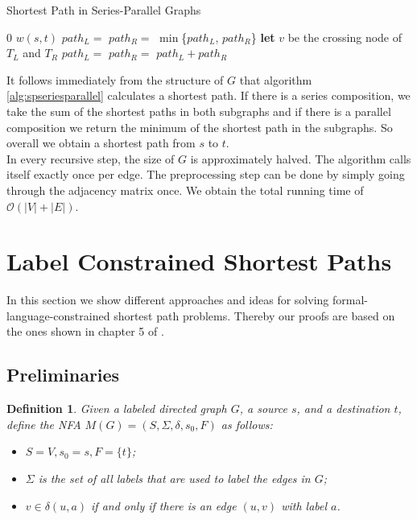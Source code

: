 \documentclass[]{article}
\newtheorem{definition}[theorem]{Definition}
\numberwithin{equation}{section}
\begin{document}
\begin{algorithm}[H]
	\caption{Shortest Path in Series-Parallel Graphs}
	\label{alg:spseriesparallel}
	\begin{algorithmic}[1]
			\State\Return $0$
		\EndIf
			\State\Return $w(s,t)$
		\EndIf
			\State $path_L=$
			\State $path_R=$
			\State\Return $\min$\{$path_L$, $path_R$\}
		\Else
			\State \textbf{let} $v$ be the crossing node of $T_L$ and $T_R$
			\State $path_L=$
			\State $path_R=$
			\State\Return $path_L + path_R$
		\EndIf
		\EndProcedure
	\end{algorithmic}
\end{algorithm}

It follows immediately from the structure of $G$ that algorithm \ref{alg:spseriesparallel} calculates a shortest path. If there is a series composition, we take the sum of the shortest paths in both subgraphs and if there is a parallel composition we return the minimum of the shortest path in the subgraphs. So overall we obtain a shortest path from $s$ to $t$.\\

In every recursive step, the size of $G$ is approximately halved. The algorithm calls itself exactly once per edge. The preprocessing step can be done by simply going through the adjacency matrix once. We obtain the total running time of $\mathcal{O}(|V|+|E|)$.

\newpage

\section{Label Constrained Shortest Paths}
\label{sec:shp}

In this section we show different approaches and ideas for solving formal-language-constrained shortest path problems. Thereby our proofs are based on the ones shown in chapter 5 of \cite{BJM00}.

\subsection{Preliminaries}
\label{sec:shp:invest}

\begin{definition}
	\label{def:nfaofgraph}
	Given a labeled directed graph $G$, a source $s$, and a destination	$t$, define the NFA $M(G) =	(S, \Sigma, \delta, s_0, F)$ as follows:
	\begin{itemize}
		\item[(i)] $S = V, s_0 = s, F = \{t\}$;
		\item[(ii)] $\Sigma$ is the set of all labels that are used to label the edges in $G$;
		\item[(iii)] $v\in\delta(u, a)$ if and only if there is an edge $(u, v)$ with label $a$.
	\end{itemize}
\end{definition}
\end{document}
